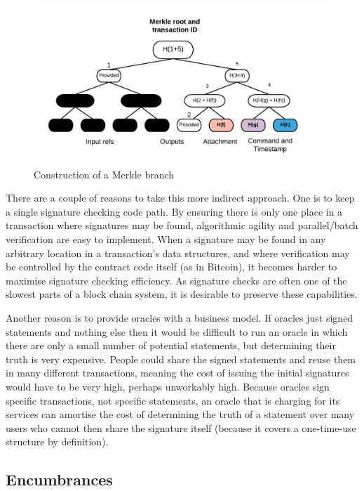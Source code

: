 \documentclass{article}
\begin{document}
\begin{figure}[H]
\includegraphics[width=\textwidth]{tearoffs2}
\caption{Construction of a Merkle branch}
\end{figure}


There are a couple of reasons to take this more indirect approach. One is to keep a single signature checking
code path. By ensuring there is only one place in a transaction where signatures may be found, algorithmic
agility and parallel/batch verification are easy to implement. When a signature may be found in any arbitrary
location in a transaction's data structures, and where verification may be controlled by the contract code itself (as in Bitcoin),
it becomes harder to maximise signature checking efficiency. As signature checks are often one of the slowest parts
of a block chain system, it is desirable to preserve these capabilities.

Another reason is to provide oracles with a business model. If oracles just signed statements and nothing else then
it would be difficult to run an oracle in which there are only a small number of potential statements, but
determining their truth is very expensive. People could share the signed statements and reuse them in many different
transactions, meaning the cost of issuing the initial signatures would have to be very high, perhaps
unworkably high. Because oracles sign specific transactions, not specific statements, an oracle that is charging
for its services can amortise the cost of determining the truth of a statement over many users who cannot then
share the signature itself (because it covers a one-time-use structure by definition).

\subsection{Encumbrances}\label{sec:encumbrances}
\end{document}
